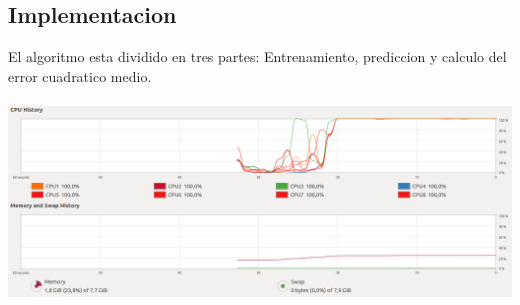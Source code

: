 \documentclass[a4paper,10pt]{article}
\begin{document}
	\subsection{Implementacion}
	El algoritmo esta dividido en tres partes: Entrenamiento, prediccion y calculo del error cuadratico medio. \\ \\ \includegraphics[width=\textwidth]{timeline0}\\
\end{document}

